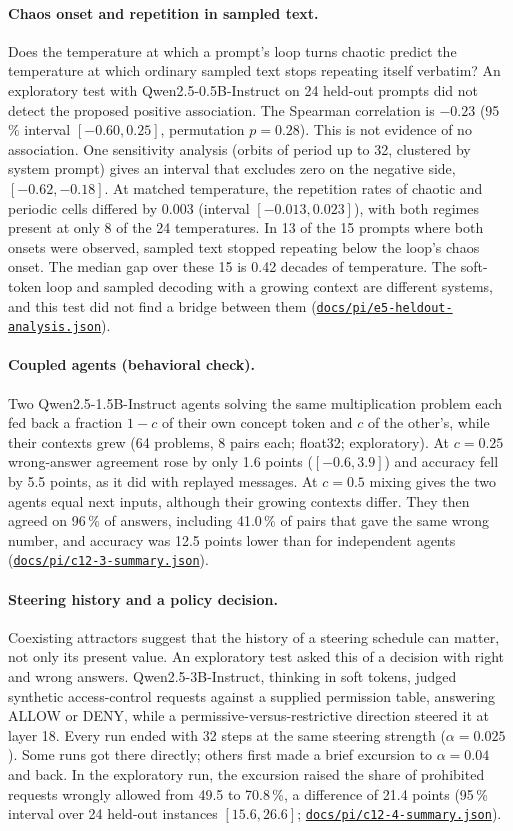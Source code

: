 \documentclass[11pt,letterpaper]{article}
\newcommand{\repourl}{https://github.com/tdj28/neural-shrimp}
\newcommand{\reporef}{arxiv-v1}
\newcommand{\repo}[1]{\href{\repourl/blob/\reporef/#1}{\nolinkurl{#1}}}
\begin{document}
\paragraph{Chaos onset and repetition in sampled text.} Does the temperature at which a prompt's loop turns chaotic
predict the temperature at which ordinary sampled text stops repeating itself verbatim? An exploratory test with
Qwen2.5-0.5B-Instruct on 24 held-out prompts did not detect the proposed positive association. The Spearman
correlation is $-0.23$ (95\,\% interval $[-0.60,0.25]$, permutation $p=0.28$). This is not evidence of no association.
One sensitivity analysis (orbits of period up to 32, clustered by system prompt) gives an interval that excludes zero
on the negative side, $[-0.62,-0.18]$. At matched temperature, the repetition rates of chaotic and periodic cells
differed by 0.003 (interval $[-0.013,0.023]$), with both regimes present at only 8 of the 24 temperatures. In 13 of
the 15 prompts where both onsets were observed, sampled text stopped repeating below the loop's chaos onset. The
median gap over these 15 is 0.42 decades of temperature. The soft-token loop and sampled decoding with a growing
context are different systems, and this test did not find a bridge between them
(\repo{docs/pi/e5-heldout-analysis.json}).

\paragraph{Coupled agents (behavioral check).} Two Qwen2.5-1.5B-Instruct agents solving the same multiplication
problem each fed back a fraction $1-c$ of their own concept token and $c$ of the other's, while their contexts grew
(64 problems, 8 pairs each; float32; exploratory). At $c=0.25$ wrong-answer agreement rose by only 1.6 points
($[-0.6,3.9]$) and accuracy fell by 5.5 points, as it did with replayed messages. At $c=0.5$ mixing gives the two agents
equal next inputs, although their growing contexts differ. They then agreed on 96\,\% of answers, including
41.0\,\% of pairs that gave the same wrong number, and accuracy was 12.5 points lower than for independent agents
(\repo{docs/pi/c12-3-summary.json}).

\paragraph{Steering history and a policy decision.} Coexisting attractors suggest that the history of a steering
schedule can matter, not only its present value. An exploratory test asked this of a decision with right and wrong
answers. Qwen2.5-3B-Instruct, thinking in soft tokens, judged synthetic access-control requests against a supplied
permission table, answering ALLOW or DENY, while a permissive-versus-restrictive direction steered it at layer 18.
Every run ended with 32 steps at the same steering strength ($\alpha=0.025$). Some runs got there directly; others
first made a brief excursion to $\alpha=0.04$ and back. In the exploratory run, the excursion raised the share of
prohibited requests wrongly allowed from 49.5 to 70.8\,\%, a difference of 21.4 points (95\,\% interval over 24
held-out instances $[15.6,26.6]$; \repo{docs/pi/c12-4-summary.json}).
\end{document}
